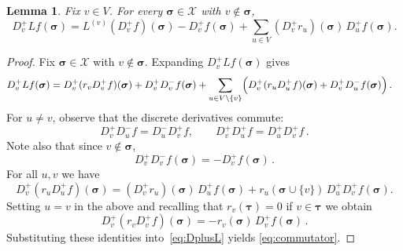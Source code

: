 \documentclass[10pt,a4paper]{amsart}
\newtheorem{lemma}[theorem]{Lemma}
\newcommand{\sigmabf}{ \boldsymbol{\sigma} }
\newcommand{\taubf}{ \boldsymbol{\tau} }
\begin{document}
	\begin{lemma}\label{lem:commutator}
		Fix $v\in V$. For every $\sigmabf\in\mathcal X$ with $v\notin \sigmabf$,
		\begin{equation}\label{eq:commutator}
			D_v^+Lf(\sigmabf)
			=
			L^{(v)}(D_v^+f)(\sigmabf)
			-
			D_v^+f(\sigmabf)
			+
			\sum_{u\in V}(D_v^+r_u)(\sigmabf)\,D_u^+f(\sigmabf).
		\end{equation}
	\end{lemma}
	
	\begin{proof}
		Fix $\sigmabf\in\mathcal X$ with $v\notin \sigmabf$. Expanding $D_v^+L f(\sigmabf)$ gives
		\begin{align}\label{eq:DplusL}
			D_v^+Lf(\sigmabf)
			&=
			D_v^+(r_vD_v^+f)(\sigmabf)+D_v^+D_v^-f(\sigmabf)+
			\sum_{\substack{u\in V\backslash\{v\}}}
			\Bigl(
			D_v^+(r_uD_u^+f)(\sigmabf)+D_v^+D_u^-f(\sigmabf)
			\Bigr)\, .
		\end{align}
		For $u\neq v$, observe that the discrete derivatives commute:
		\[
		D_v^+D_u^-f=D_u^-D_v^+f,
		\qquad
		D_v^+D_u^+f=D_u^+D_v^+f\, .
		\]
		Note also that since $v\notin \sigmabf$,
		\[
		D_v^+D_v^-f(\sigmabf)=-D_v^+f(\sigmabf)\, .
		\]
		For all $u,v$ we have
		\[
		D_v^+(r_uD_u^+f)(\sigmabf)
		=
		(D_v^+r_u)(\sigmabf)\,D_u^+f(\sigmabf)
		+
		r_u(\sigmabf\cup\{v\})\,D_u^+D_v^+f(\sigmabf).
		\]
		Setting $u=v$ in the above and recalling that $r_v(\taubf)=0$ if $v\in \taubf$ we obtain 
		\[
		D_v^+(r_vD_v^+f)(\sigmabf)=-r_v(\sigmabf)\,D_v^+f(\sigmabf)\, .
		\]
		Substituting these identities into~\eqref{eq:DplusL} yields \eqref{eq:commutator}.
	\end{proof}
	
\end{document}

